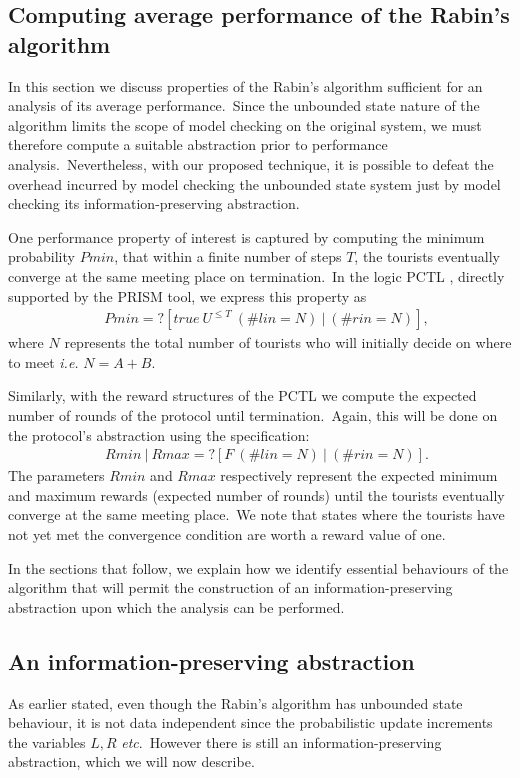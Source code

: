 \documentclass[numbers,copyright,creativecommons]{eptcs}
\begin{document}
\subsection{Computing average performance of the Rabin's algorithm}
In this section we discuss properties of the Rabin's algorithm sufficient for an analysis of its average performance.\ Since the unbounded state nature of the algorithm limits the scope of model checking on the original system, we must therefore compute a suitable abstraction prior to performance analysis.\ Nevertheless, with our proposed technique, it is possible to defeat the overhead incurred by model checking the unbounded state system just by model checking its information-preserving abstraction.

One performance property of interest is captured by computing the minimum probability $Pmin$, that within a finite number of  steps $T$, the tourists eventually converge at the same meeting place on termination.\ In the logic PCTL \cite{PCTL}, directly supported by the PRISM tool, we express this property as
\begin{eqnarray}\label{criterion}
\quad Pmin=? [true  \ U^{\le T} \ (\#lin = N) \ | \ (\#rin = N)],
\end{eqnarray}
where $N$ represents the total number of tourists who will initially decide on where to meet {\it i.e.} $\mathord{N = A + B}$.\

Similarly, with the reward structures \cite{KNP07} of the PCTL we compute the expected number of rounds of the protocol until termination.\ Again, this will be done on the protocol's abstraction using the specification:
 \begin{eqnarray}\label{reward}
\quad Rmin \ | \ Rmax =? [F \ (\#lin = N) \ | \ (\#rin = N)].
\end{eqnarray}
The parameters $Rmin$ and $Rmax$ respectively represent the expected minimum and maximum rewards (expected number of rounds)
until the tourists eventually converge at the same meeting place.\ We note that states where the tourists have not yet
 met the convergence condition are worth a reward value of one.

In the sections that follow, we explain how we identify essential behaviours of the algorithm that will permit the construction of an information-preserving abstraction upon which the analysis can be performed.

\subsection{An information-preserving abstraction}
As earlier stated, even though the Rabin's algorithm has unbounded state behaviour, it is not data independent since the probabilistic update increments the variables $L,R$ {\it etc}.\ However there is still an information-preserving abstraction, which we will now describe.
\end{document}
